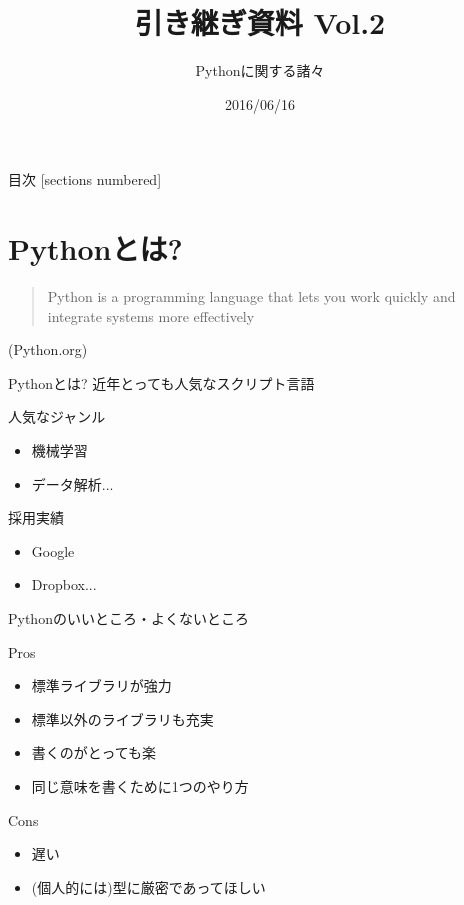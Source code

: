 \documentclass[12pt, dvipdfmx]{beamer}
\title{引き継ぎ資料 Vol.2}
\subtitle{Pythonに関する諸々}
\date{2016/06/16}
\author{}
\institute{}
\begin{document}
\maketitle
\begin{frame}{目次}
  [sections numbered]
  \tableofcontents[hideallsubsections]
\end{frame}

\section{Pythonとは?}
\begin{frame}
    \begin{quote}
        Python is a programming language that lets you work quickly and integrate systems more effectively
    \end{quote}
    \begin{flushright}
        (Python.org)
    \end{flushright}
\end{frame}
\begin{frame}{Pythonとは?}
    近年とっても人気なスクリプト言語

    \pause
    \begin{block}{人気なジャンル}
        \begin{itemize}
            \item 機械学習
            \item データ解析...
        \end{itemize}
    \end{block}

    \begin{block}{採用実績}
        \begin{itemize}
            \item Google
            \item Dropbox...
        \end{itemize}
    \end{block}
\end{frame}
\begin{frame}{Pythonのいいところ・よくないところ}
    \begin{alertblock}{Pros}
        \begin{itemize}
            \item 標準ライブラリが強力
            \item 標準以外のライブラリも充実
            \item 書くのがとっても楽
            \item 同じ意味を書くために1つのやり方
        \end{itemize}
    \end{alertblock}
    \begin{block}{Cons}
        \begin{itemize}
            \item 遅い
            \item (個人的には)型に厳密であってほしい    
        \end{itemize}
    \end{block}
\end{frame}
\end{document}
